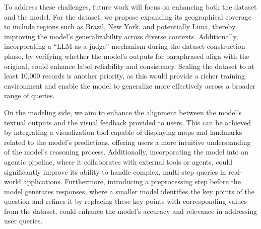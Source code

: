 To address these challenges, future work will focus on enhancing both the dataset and the model. For the dataset, we propose expanding its geographical coverage to include regions such as Brazil, New York, and potentially Lima, thereby improving the model's generalizability across diverse contexts. Additionally, incorporating a ``LLM-as-a-judge'' mechanism during the dataset construction phase, by verifying whether the model's outputs for paraphrased align with the original, could enhance label reliability and consistency. Scaling the dataset to at least 10,000 records is another priority, as this would provide a richer training environment and enable the model to generalize more effectively across a broader range of queries.

On the modeling side, we aim to enhance the alignment between the model’s textual outputs and the visual feedback provided to users. This can be achieved by integrating a visualization tool capable of displaying maps and landmarks related to the model's predictions, offering users a more intuitive understanding of the model’s reasoning process. Additionally, incorporating the model into an agentic pipeline, where it collaborates with external tools or agents, could significantly improve its ability to handle complex, multi-step queries in real-world applications. Furthermore, introducing a preprocessing step before the model generates responses, where a smaller model identifies the key points of the question and refines it by replacing these key points with corresponding values from the dataset, could enhance the model's accuracy and relevance in addressing user queries.



